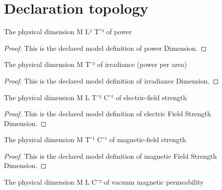 \section{Declaration topology}
\begin{definition}
  \label{def:physics:phyx-mini-0944:phyxminiproblems-problemphyxmini0944-powerdimension}
  The physical dimension M L² T⁻³ of power
\end{definition}
\begin{proof}
  This is the declared model definition of power Dimension.
\end{proof}
\begin{definition}
  \label{def:physics:phyx-mini-0944:phyxminiproblems-problemphyxmini0944-irradiancedimension}
  The physical dimension M T⁻³ of irradiance (power per area)
\end{definition}
\begin{proof}
  This is the declared model definition of irradiance Dimension.
\end{proof}
\begin{definition}
  \label{def:physics:phyx-mini-0944:phyxminiproblems-problemphyxmini0944-electricfieldstrengthdimension}
  The physical dimension M L T⁻² C⁻¹ of electric-field strength
\end{definition}
\begin{proof}
  This is the declared model definition of electric Field Strength Dimension.
\end{proof}
\begin{definition}
  \label{def:physics:phyx-mini-0944:phyxminiproblems-problemphyxmini0944-magneticfieldstrengthdimension}
  The physical dimension M T⁻¹ C⁻¹ of magnetic-field strength
\end{definition}
\begin{proof}
  This is the declared model definition of magnetic Field Strength Dimension.
\end{proof}
\begin{definition}
  \label{def:physics:phyx-mini-0944:phyxminiproblems-problemphyxmini0944-magneticpermeabilitydimension}
  The physical dimension M L C⁻² of vacuum magnetic permeability
\end{definition}
